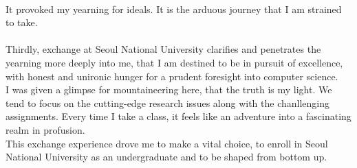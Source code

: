 \documentclass{article}
\begin{document}
\\
It provoked my yearning for ideals. It is the arduous journey that I am strained to take.\\
\\
Thirdly, exchange at Seoul National University clarifies and penetrates the yearning more deeply into me, that I am destined to be in pursuit of excellence, with honest and unironic hunger for a prudent foresight into computer science. \\
I was given a glimpse for mountaineering here, that the truth is my light. We tend to focus on the cutting-edge research issues along with the chanllenging assignments. Every time I take a class, it feels like an adventure into a fascinating realm in profusion.\\
This exchange experience drove me to make a vital choice, to enroll in Seoul National University as an undergraduate and to be shaped from bottom up. \\
\\
\end{document}
